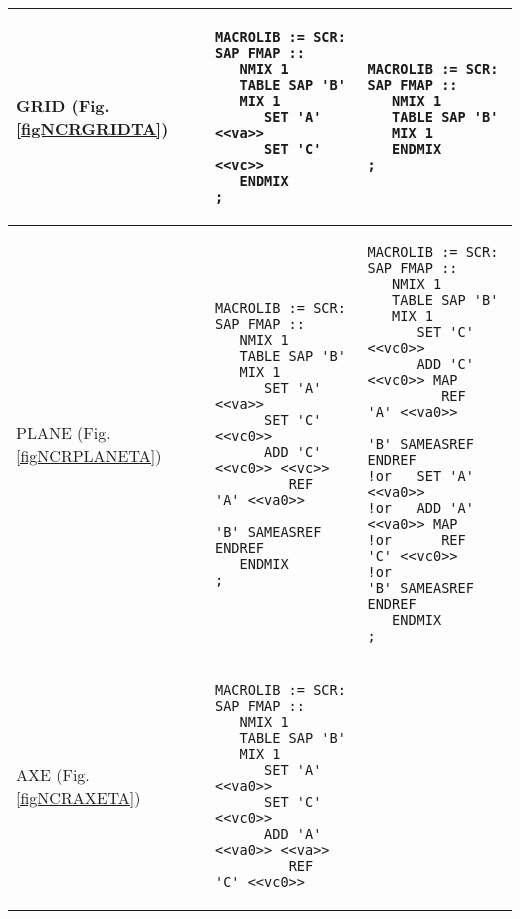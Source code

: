 \begin{center}
\tablelasttail{\hline}

\begin{supertabular}{|p{0.1\textwidth}|p{0.4\textwidth}|p{0.4\textwidth}|}
\hline
GRID (Fig. \ref{figNCRGRIDTA}) & 
\begin{verbatim}
MACROLIB := SCR: SAP FMAP ::
   NMIX 1
   TABLE SAP 'B' 
   MIX 1 
      SET 'A' <<va>>
      SET 'C' <<vc>>
   ENDMIX
;
\end{verbatim} &
\begin{verbatim}
MACROLIB := SCR: SAP FMAP ::
   NMIX 1
   TABLE SAP 'B' 
   MIX 1 
   ENDMIX
;
\end{verbatim} \\
\hline
PLANE (Fig. \ref{figNCRPLANETA}) & 
\begin{verbatim}
MACROLIB := SCR: SAP FMAP ::
   NMIX 1
   TABLE SAP 'B' 
   MIX 1 
      SET 'A' <<va>>
      SET 'C' <<vc0>>
      ADD 'C' <<vc0>> <<vc>>
         REF  'A' <<va0>> 
              'B' SAMEASREF ENDREF
   ENDMIX
;
\end{verbatim} &
\begin{verbatim}
MACROLIB := SCR: SAP FMAP ::
   NMIX 1
   TABLE SAP 'B' 
   MIX 1 
      SET 'C' <<vc0>>
      ADD 'C' <<vc0>> MAP
         REF  'A' <<va0>> 
              'B' SAMEASREF ENDREF
!or   SET 'A' <<va0>>
!or   ADD 'A' <<va0>> MAP
!or      REF  'C' <<vc0>> 
!or           'B' SAMEASREF ENDREF
   ENDMIX
;
\end{verbatim} \\
\hline
AXE (Fig. \ref{figNCRAXETA}) & 
\begin{verbatim}
MACROLIB := SCR: SAP FMAP ::
   NMIX 1
   TABLE SAP 'B' 
   MIX 1 
      SET 'A' <<va0>>
      SET 'C' <<vc0>>
      ADD 'A' <<va0>> <<va>>
         REF  'C' <<vc0>> 

\end{verbatim}
\end{supertabular}
\end{center}
